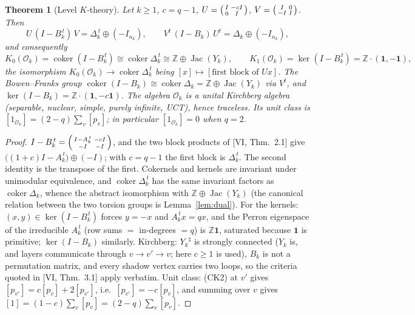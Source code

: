 \documentclass[11pt]{amsart}
\numberwithin{equation}{section}
\newtheorem{theorem}{Theorem}[section]
\theoremstyle{definition}
\theoremstyle{remark}
\newcommand{\Z}{\mathbb{Z}}
\newcommand{\cO}{\mathcal{O}}
\newcommand{\Jac}{\operatorname{Jac}}
\newcommand{\coker}{\operatorname{coker}}
\newcommand{\shadow}[1]{{#1}^{\sharp}}
\begin{document}
\begin{theorem}[Level $K$-theory]\label{thm:level}
Let $k\ge1$, $c=q-1$, $U=\begin{psmallmatrix}I&-cI\\0&I\end{psmallmatrix}$,
$V=\begin{psmallmatrix}I&0\\-I&I\end{psmallmatrix}$. Then
\begin{equation}\label{eq:factor}
U\,(I-B_k^{\,t})\,V=\Delta_k^{\,t}\oplus(-I_{n_k}),\qquad
V^{t}\,(I-B_k)\,U^{t}=\Delta_k\oplus(-I_{n_k}),
\end{equation}
and consequently
\[
K_0(\cO_k)=\coker(I-B_k^{\,t})\cong\coker\Delta_k^{\,t}\cong\Z\oplus\Jac(Y_k),\qquad
K_1(\cO_k)=\ker(I-B_k^{\,t})=\Z\cdot(\mathbf1,-\mathbf1),
\]
the isomorphism $K_0(\cO_k)\to\coker\Delta_k^{\,t}$ being $[x]\mapsto[\text{first block
of }Ux]$. The Bowen--Franks group $\coker(I-B_k)\cong\coker\Delta_k=\Z\oplus\Jac(Y_k)$
via $V^t$, and $\ker(I-B_k)=\Z\cdot(\mathbf1,-c\mathbf1)$. The algebra $\cO_k$ is a
unital Kirchberg algebra (separable, nuclear, simple, purely infinite, UCT), hence
traceless. Its unit class is $[1_{\cO_k}]=(2-q)\sum_v[p_v]$; in particular
$[1_{\cO_k}]=0$ when $q=2$.
\end{theorem}

\begin{proof}
$I-B_k^{\,t}=\begin{psmallmatrix}I-A_k^{\,t}&-cI\\-I&-I\end{psmallmatrix}$, and the two
block products of [VI, Thm.~2.1] give $\bigl((1+c)I-A_k^{\,t}\bigr)\oplus(-I)$; with
$c=q-1$ the first block is $\Delta_k^{\,t}$. The second identity is the transpose of
the first. Cokernels and kernels are invariant under unimodular equivalence, and
$\coker\Delta_k^{\,t}$ has the same invariant factors as $\coker\Delta_k$, whence the
abstract isomorphism with $\Z\oplus\Jac(Y_k)$ (the canonical relation between the two
torsion groups is Lemma~\ref{lem:dual}). For the kernels: $(x,y)\in\ker(I-B_k^{\,t})$
forces $y=-x$ and $A_k^{\,t}x=qx$, and the Perron eigenspace of the irreducible
$A_k^{\,t}$ (row sums $=$ in-degrees $=q$) is $\Z\mathbf1$, saturated because $\mathbf1$
is primitive; $\ker(I-B_k)$ similarly. Kirchberg: $\shadow{Y_k}$ is strongly connected
($Y_k$ is, and layers communicate through $v\to v'\to v$; here $c\ge1$ is used), $B_k$
is not a permutation matrix, and every shadow vertex carries two loops, so the criteria
quoted in [VI, Thm.~3.1] apply verbatim. Unit class: (CK2) at $v'$ gives
$[p_{v'}]=c[p_v]+2[p_{v'}]$, i.e.\ $[p_{v'}]=-c[p_v]$, and summing over $v$ gives
$[1]=(1-c)\sum_v[p_v]=(2-q)\sum_v[p_v]$.
\end{proof}
\end{document}
